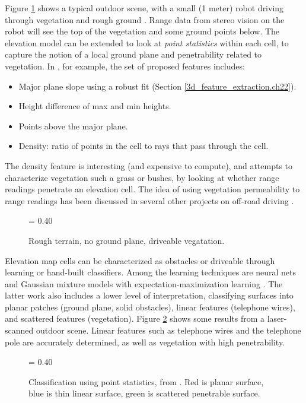 \documentclass[twocolumn,oneside]{book}
\begin{document}
Figure \ref{rough_terrain.ch22} shows a typical outdoor scene, with a
small (1 meter) robot driving through vegetation and rough ground
\cite{konolige06}.  Range data from stereo vision on the robot will
see the top of the vegetation and some ground points below.  The
elevation model can be extended to look at {\em point statistics}
within each cell, to capture the notion of a local ground plane and
penetrability related to vegetation.  In \cite{ollis06}, for
example, the set of proposed features includes:
\begin{itemize}
\item Major plane slope using a robust fit (Section
\ref{3d_feature_extraction.ch22}). 
\item Height difference of max and min heights.
\item Points above the major plane.
\item Density: ratio of points in the cell to rays that pass through
the cell.
\end{itemize}
The density feature is interesting (and expensive to compute), and
attempts to characterize vegetation such a grass or bushes, by looking
at whether range readings penetrate an elevation cell.  The idea of
using vegetation permeability to range readings has been discussed in
several other projects on off-road driving
\cite{manduchi03,lalonde05,kelly05}.  

\begin{figure}[hbt]
{\epsfxsize = 0.40\textwidth {}}
\caption{Rough terrain, no ground plane, driveable vegatation.
\label{rough_terrain.ch22}}
\end{figure}

Elevation map cells can be characterized as obstacles or driveable
through learning or hand-built classifiers.  Among the learning
techniques are neural nets \cite{ollis06} and Gaussian mixture
models with expectation-maximization learning \cite{vandapel06}.
The latter work also includes a lower level of interpretation,
classifying surfaces into planar patches (ground plane, solid
obstacles), linear features (telephone wires), and scattered features
(vegetation).  Figure \ref{point_classified.ch22} shows some results
from a laser-scanned outdoor scene.  Linear features such as telephone
wires and the telephone pole are accurately determined, as well as
vegetation with high penetrability.

\begin{figure}[hbt]
{\epsfxsize = 0.40\textwidth {}}
\caption{Classification using point statistics, from
\cite{vandapel06}.  Red is planar surface, blue is thin linear
surface, green is scattered penetrable surface.
\label{point_classified.ch22}}
\end{figure}
\end{document}
